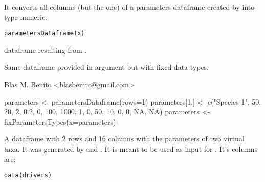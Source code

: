 \documentclass[letterpaper]{book}
\begin{document}
%
\begin{Description}\relax
It converts all columns (but the  one) of a parameters dataframe created by  into type numeric.
\end{Description}
%
\begin{Usage}
\begin{verbatim}
parametersDataframe(x)
\end{verbatim}
\end{Usage}
%
\begin{Arguments}
\begin{ldescription}
\item[\code{x}] dataframe resulting from .
\end{ldescription}
\end{Arguments}
%
\begin{Value}
Same dataframe provided in argument  but with fixed data types.
\end{Value}
%
\begin{Author}\relax
Blas M. Benito  <blasbenito@gmail.com>
\end{Author}
%
\begin{SeeAlso}\relax
{}
\end{SeeAlso}
%
\begin{Examples}
\begin{ExampleCode}

parameters <- parametersDataframe(rows=1)
parameters[1,] <- c("Species 1", 50, 20, 2, 0.2, 0, 100, 1000, 1, 0, 50, 10, 0, 0, NA, NA)
parameters <- fixParametersTypes(x=parameters)

\end{ExampleCode}
\end{Examples}
%
\begin{Description}\relax
A dataframe with 2 rows and 16 columns with the parameters of two virtual taxa. It was generated by  and . It is meant to be used as input for . It's columns are:
\end{Description}
%
\begin{Usage}
\begin{verbatim}
data(drivers)
\end{verbatim}
\end{Usage}
\end{document}

